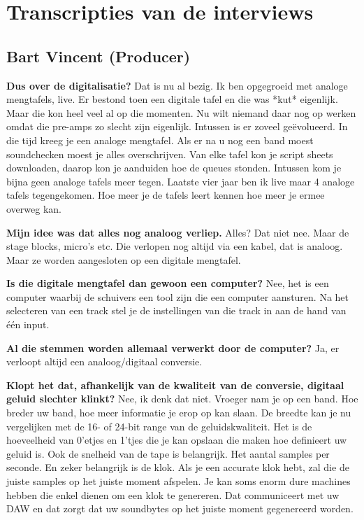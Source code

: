 \chapter{Transcripties van de interviews}

\section{Bart Vincent (Producer)}
\label{trans:bartvincent}

\textbf{Dus over de digitalisatie?}\newline
Dat is nu al bezig. Ik ben opgegroeid met analoge mengtafels, live. Er bestond toen een digitale tafel en die was *kut* eigenlijk. Maar die kon heel veel al op die momenten.
Nu wilt niemand daar nog op werken omdat die pre-amps zo slecht zijn eigenlijk. Intussen is er zoveel geëvolueerd.
In die tijd kreeg je een analoge mengtafel. Als er na u nog een band moest soundchecken moest je alles overschrijven.
Van elke tafel kon je script sheets downloaden, daarop kon je aanduiden hoe de queues stonden.
Intussen kom je bijna geen analoge tafels meer tegen.
Laatste vier jaar ben ik live maar 4 analoge tafels tegengekomen.
Hoe meer je de tafels leert kennen hoe meer je ermee overweg kan.

\textbf{Mijn idee was dat alles nog analoog verliep.}\newline
Alles? Dat niet nee. Maar de stage blocks, micro's etc. Die verlopen nog altijd via een kabel, dat is analoog.
Maar ze worden aangesloten op een digitale mengtafel.

\textbf{Is die digitale mengtafel dan gewoon een computer?}\newline
Nee, het is een computer waarbij de schuivers een tool zijn die een computer aansturen.
Na het selecteren van een track stel je de instellingen van die track in aan de hand van één input.

\textbf{Al die stemmen worden allemaal verwerkt door de computer?}\newline
Ja, er verloopt altijd een analoog/digitaal conversie.

\textbf{Klopt het dat, afhankelijk van de kwaliteit van de conversie, digitaal geluid slechter klinkt?}\newline
Nee, ik denk dat niet. Vroeger nam je op een band. Hoe breder uw band, hoe meer informatie je erop op kan slaan. De breedte kan je nu vergelijken met de 16- of 24-bit range van de geluidskwaliteit. Het is de hoeveelheid van 0'etjes en 1'tjes die je kan opslaan die maken hoe definieert uw geluid is.
Ook de snelheid van de tape is belangrijk. Het aantal samples per seconde. En zeker belangrijk is de klok. Als je een accurate klok hebt, zal die de juiste samples op het juiste moment afspelen. Je kan soms enorm dure machines hebben die enkel dienen om een klok te genereren. Dat communiceert met uw DAW en dat zorgt dat uw soundbytes op het juiste moment gegenereerd worden.

